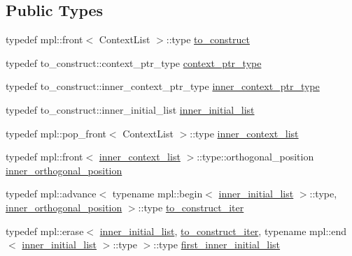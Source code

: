 \subsection*{Public Types}
\begin{DoxyCompactItemize}
\item 
typedef mpl\+::front$<$ Context\+List $>$\+::type \mbox{\hyperlink{structboost_1_1statechart_1_1detail_1_1outer__constructor_a9ebebe2d638d5f65279cc24fab763952}{to\+\_\+construct}}
\item 
typedef to\+\_\+construct\+::context\+\_\+ptr\+\_\+type \mbox{\hyperlink{structboost_1_1statechart_1_1detail_1_1outer__constructor_a2cfbd893ac80c92ac2e6ba1149851266}{context\+\_\+ptr\+\_\+type}}
\item 
typedef to\+\_\+construct\+::inner\+\_\+context\+\_\+ptr\+\_\+type \mbox{\hyperlink{structboost_1_1statechart_1_1detail_1_1outer__constructor_aa3fd039947106ceda4fa68a41f9d3307}{inner\+\_\+context\+\_\+ptr\+\_\+type}}
\item 
typedef to\+\_\+construct\+::inner\+\_\+initial\+\_\+list \mbox{\hyperlink{structboost_1_1statechart_1_1detail_1_1outer__constructor_a4c1c7fd76b5d06da5ebc2dc2c99444f9}{inner\+\_\+initial\+\_\+list}}
\item 
typedef mpl\+::pop\+\_\+front$<$ Context\+List $>$\+::type \mbox{\hyperlink{structboost_1_1statechart_1_1detail_1_1outer__constructor_a54865d68e270edafc233566aa9b296f0}{inner\+\_\+context\+\_\+list}}
\item 
typedef mpl\+::front$<$ \mbox{\hyperlink{structboost_1_1statechart_1_1detail_1_1outer__constructor_a54865d68e270edafc233566aa9b296f0}{inner\+\_\+context\+\_\+list}} $>$\+::type\+::orthogonal\+\_\+position \mbox{\hyperlink{structboost_1_1statechart_1_1detail_1_1outer__constructor_a4ef3f9542315cf35992826bd96cd9ece}{inner\+\_\+orthogonal\+\_\+position}}
\item 
typedef mpl\+::advance$<$ typename mpl\+::begin$<$ \mbox{\hyperlink{structboost_1_1statechart_1_1detail_1_1outer__constructor_a4c1c7fd76b5d06da5ebc2dc2c99444f9}{inner\+\_\+initial\+\_\+list}} $>$\+::type, \mbox{\hyperlink{structboost_1_1statechart_1_1detail_1_1outer__constructor_a4ef3f9542315cf35992826bd96cd9ece}{inner\+\_\+orthogonal\+\_\+position}} $>$\+::type \mbox{\hyperlink{structboost_1_1statechart_1_1detail_1_1outer__constructor_a90925740f3c0336f09a152967a7e7173}{to\+\_\+construct\+\_\+iter}}
\item 
typedef mpl\+::erase$<$ \mbox{\hyperlink{structboost_1_1statechart_1_1detail_1_1outer__constructor_a4c1c7fd76b5d06da5ebc2dc2c99444f9}{inner\+\_\+initial\+\_\+list}}, \mbox{\hyperlink{structboost_1_1statechart_1_1detail_1_1outer__constructor_a90925740f3c0336f09a152967a7e7173}{to\+\_\+construct\+\_\+iter}}, typename mpl\+::end$<$ \mbox{\hyperlink{structboost_1_1statechart_1_1detail_1_1outer__constructor_a4c1c7fd76b5d06da5ebc2dc2c99444f9}{inner\+\_\+initial\+\_\+list}} $>$\+::type $>$\+::type \mbox{\hyperlink{structboost_1_1statechart_1_1detail_1_1outer__constructor_aeaaf7a8578d83f93cf3a1f90011ec87b}{first\+\_\+inner\+\_\+initial\+\_\+list}}

\end{DoxyCompactItemize}
